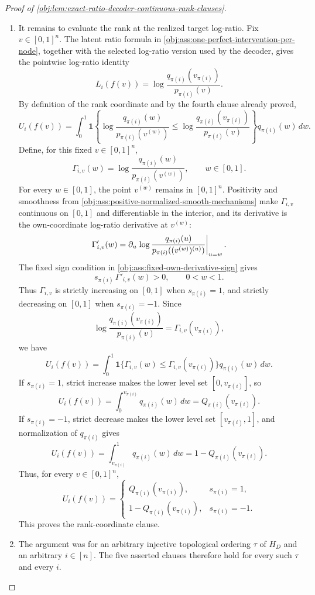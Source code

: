 \begin{proof}[Proof of \cref{obj:lem:exact-ratio-decoder-continuous-rank-clauses}]
\begin{enumerate}
\item It remains to evaluate the rank at the realized target log-ratio.  Fix \(v\in[0,1]^n\).  The latent ratio formula in \cref{obj:ass:one-perfect-intervention-per-node}, together with the selected log-ratio version used by the decoder, gives the pointwise log-ratio identity
\[
L_i(f(v))
=
\log\frac{q_{\pi(i)}(v_{\pi(i)})}{p_{\pi(i)}(v)} .
\]
By definition of the rank coordinate and by the fourth clause already proved,
\[
U_i(f(v))
=
\int_0^1
\mathbf 1\!\left\{
\log\frac{q_{\pi(i)}(w)}{p_{\pi(i)}(v^{(w)})}
\le
\log\frac{q_{\pi(i)}(v_{\pi(i)})}{p_{\pi(i)}(v)}
\right\}
q_{\pi(i)}(w)\,dw .
\]
Define, for this fixed \(v\in[0,1]^n\),
\[
\Gamma_{i,v}(w)
=
\log\frac{q_{\pi(i)}(w)}{p_{\pi(i)}(v^{(w)})},
\qquad
w\in[0,1].
\]
For every \(w\in[0,1]\), the point \(v^{(w)}\) remains in \([0,1]^n\).  Positivity and smoothness from \cref{obj:ass:positive-normalized-smooth-mechanisms} make \(\Gamma_{i,v}\) continuous on \([0,1]\) and differentiable in the interior, and its derivative is the own-coordinate log-ratio derivative at \(v^{(w)}\):
\[
\Gamma'_{i,v}(w)
=
\partial_{u}\nobreak\left.
\log\frac{q_{\pi(i)}(u)}{p_{\pi(i)}((v^{(w)})^{(u)})}
\right|_{u=w}.
\]
The fixed sign condition in \cref{obj:ass:fixed-own-derivative-sign} gives
\[
s_{\pi(i)}\,\Gamma'_{i,v}(w)>0,
\qquad 0<w<1.
\]
Thus \(\Gamma_{i,v}\) is strictly increasing on \([0,1]\) when \(s_{\pi(i)}=1\), and strictly decreasing on \([0,1]\) when \(s_{\pi(i)}=-1\).  Since
\[
\log\frac{q_{\pi(i)}(v_{\pi(i)})}{p_{\pi(i)}(v)}
=
\Gamma_{i,v}(v_{\pi(i)}),
\]
we have
\[
U_i(f(v))
=
\int_0^1
\mathbf 1\{\Gamma_{i,v}(w)\le \Gamma_{i,v}(v_{\pi(i)})\}
q_{\pi(i)}(w)\,dw .
\]
If \(s_{\pi(i)}=1\), strict increase makes the lower level set \([0,v_{\pi(i)}]\), so
\[
U_i(f(v))
=
\int_0^{v_{\pi(i)}}q_{\pi(i)}(w)\,dw
=
Q_{\pi(i)}(v_{\pi(i)}).
\]
If \(s_{\pi(i)}=-1\), strict decrease makes the lower level set \([v_{\pi(i)},1]\), and normalization of \(q_{\pi(i)}\) gives
\[
U_i(f(v))
=
\int_{v_{\pi(i)}}^1 q_{\pi(i)}(w)\,dw
=
1-Q_{\pi(i)}(v_{\pi(i)}).
\]
Thus, for every \(v\in[0,1]^n\),
\[
U_i(f(v))
=
\begin{cases}
Q_{\pi(i)}(v_{\pi(i)}), & s_{\pi(i)}=1,\\
1-Q_{\pi(i)}(v_{\pi(i)}), & s_{\pi(i)}=-1.
\end{cases}
\]
This proves the rank-coordinate clause. %

\item The argument was for an arbitrary injective topological ordering \(\tau\) of \(H_D\) and an arbitrary \(i\in[n]\).  The five asserted clauses therefore hold for every such \(\tau\) and every \(i\). %
\end{enumerate}
\end{proof}
